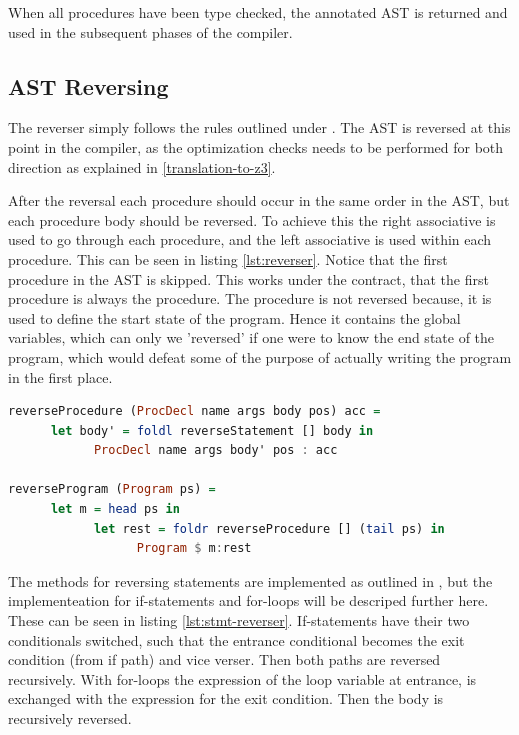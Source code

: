 When all procedures have been type checked, the annotated AST is returned and used in the
subsequent phases of the compiler.

\subsection{AST Reversing \rr}
The reverser simply follows the rules outlined under . The AST is
reversed at this point in the compiler, as the optimization checks needs to be performed for both
direction as explained in \ref{translation-to-z3}.

After the reversal each procedure should occur in the same order in the AST, but each
procedure body should be reversed. To achieve this the right associative  is used to
go through each procedure, and the left associative  is used within each procedure.
This can be seen in listing \ref{lst:reverser}. Notice that the first procedure in the AST is
skipped. This works under the contract, that the first procedure is always the 
procedure. The  procedure is not reversed because, it is used to define the start state
of the program. Hence it contains the global variables, which can only we 'reversed' if one were
to know the end state of the program, which would defeat some of the purpose of actually writing
the program in the first place.

\begin{lstlisting}[language=Haskell, label={lst:reverser}, caption={Reversing AST.}]
reverseProcedure (ProcDecl name args body pos) acc =
      let body' = foldl reverseStatement [] body in
            ProcDecl name args body' pos : acc

reverseProgram (Program ps) =
      let m = head ps in
            let rest = foldr reverseProcedure [] (tail ps) in
                  Program $ m:rest
\end{lstlisting}
\noindent
The methods for reversing statements are implemented as outlined in ,
but the implementeation for if-statements and for-loops will be descriped further here. These
can be seen in listing \ref{lst:stmt-reverser}. If-statements have their two conditionals switched,
such that the entrance conditional becomes the exit condition (from if path) and vice verser.
Then both paths are reversed recursively. With for-loops the expression of the loop variable at
entrance, is exchanged with the expression for the exit condition. Then the body is recursively
reversed.


